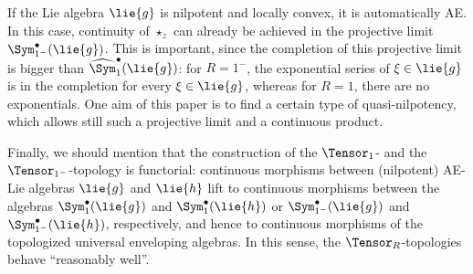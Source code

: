 \documentclass[
11pt,                          %
english                        %
]{article}
\begin{document}
If the Lie algebra $\lie{g}$ is nilpotent and locally convex, it is automatically 
AE. In this case, continuity of $\star_z$ can already be achieved in the projective 
limit $\Sym_{1^-}^{\bullet}(\lie{g})$. This is important, since the completion of 
this projective limit is bigger than $\widehat{\Sym}_1^{\bullet}(\lie{g})$: for $R = 
1^-$, the exponential series of $\xi \in \lie{g}$ is in the completion for every 
$\xi \in \lie{g}$, whereas for $R = 1$, there are no exponentials. One aim of this 
paper is to find a certain type of quasi-nilpotency, which allows still such a 
projective limit and a continuous product.

Finally, we should mention that the construction of the $\Tensor_1$- and the 
$\Tensor_{1^-}$-topology is functorial: continuous morphisms between (nilpotent) 
AE-Lie algebras $\lie{g}$ and $\lie{h}$ lift to continuous morphisms between the 
algebras $\Sym_1^{\bullet}(\lie{g})$ and $\Sym_1^{\bullet}(\lie{h})$ or 
$\Sym_{1^-}^{\bullet}(\lie{g})$ and $\Sym_{1^-}^{\bullet}(\lie{h})$, respectively, 
and hence to continuous morphisms of the topologized universal enveloping algebras.
In this sense, the $\Tensor_R$-topologies behave ``reasonably well''.
\end{document}
